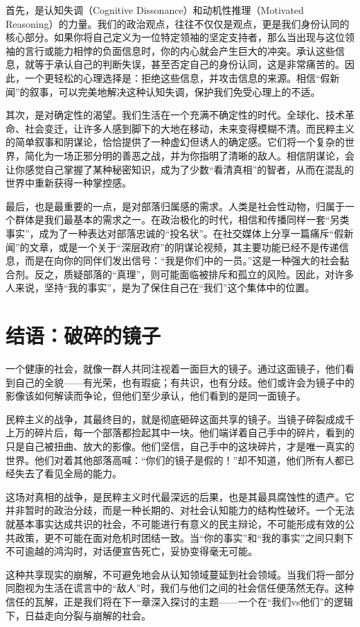 首先，是认知失调（Cognitive Dissonance）和动机性推理（Motivated Reasoning）的力量。我们的政治观点，往往不仅仅是观点，更是我们身份认同的核心部分。如果你将自己定义为一位特定领袖的坚定支持者，那么当出现与这位领袖的言行或能力相悖的负面信息时，你的内心就会产生巨大的冲突。承认这些信息，就等于承认自己的判断失误，甚至否定自己的身份认同，这是非常痛苦的。因此，一个更轻松的心理选择是：拒绝这些信息，并攻击信息的来源。相信“假新闻”的叙事，可以完美地解决这种认知失调，保护我们免受心理上的不适。

其次，是对确定性的渴望。我们生活在一个充满不确定性的时代。全球化、技术革命、社会变迁，让许多人感到脚下的大地在移动，未来变得模糊不清。而民粹主义的简单叙事和阴谋论，恰恰提供了一种虚幻但诱人的确定感。它们将一个复杂的世界，简化为一场正邪分明的善恶之战，并为你指明了清晰的敌人。相信阴谋论，会让你感觉自己掌握了某种秘密知识，成为了少数“看清真相”的智者，从而在混乱的世界中重新获得一种掌控感。

最后，也是最重要的一点，是对部落归属感的需求。人类是社会性动物，归属于一个群体是我们最基本的需求之一。在政治极化的时代，相信和传播同样一套“另类事实”，成为了一种表达对部落忠诚的“投名状”。在社交媒体上分享一篇痛斥“假新闻”的文章，或是一个关于“深层政府”的阴谋论视频，其主要功能已经不是传递信息，而是在向你的同伴们发出信号：“我是你们中的一员。”这是一种强大的社会黏合剂。反之，质疑部落的“真理”，则可能面临被排斥和孤立的风险。因此，对许多人来说，坚持“我的事实”，是为了保住自己在“我们”这个集体中的位置。

\section{结语：破碎的镜子}
一个健康的社会，就像一群人共同注视着一面巨大的镜子。通过这面镜子，他们看到自己的全貌——有光荣，也有瑕疵；有共识，也有分歧。他们或许会为镜子中的影像该如何解读而争论，但他们至少承认，他们看到的是同一面镜子。

民粹主义的战争，其最终目的，就是彻底砸碎这面共享的镜子。当镜子碎裂成成千上万的碎片后，每一个部落都捡起其中一块。他们端详着自己手中的碎片，看到的只是自己被扭曲、放大的影像。他们坚信，自己手中的这块碎片，才是唯一真实的世界。他们对着其他部落高喊：“你们的镜子是假的！”却不知道，他们所有人都已经失去了看见全局的能力。

这场对真相的战争，是民粹主义时代最深远的后果，也是其最具腐蚀性的遗产。它并非暂时的政治分歧，而是一种长期的、对社会认知能力的结构性破坏。一个无法就基本事实达成共识的社会，不可能进行有意义的民主辩论，不可能形成有效的公共政策，更不可能在面对危机时团结一致。当“你的事实”和“我的事实”之间只剩下不可逾越的鸿沟时，对话便宣告死亡，妥协变得毫无可能。

这种共享现实的崩解，不可避免地会从认知领域蔓延到社会领域。当我们将一部分同胞视为生活在谎言中的“敌人”时，我们与他们之间的社会信任便荡然无存。这种信任的瓦解，正是我们将在下一章深入探讨的主题——一个在“我们vs他们”的逻辑下，日益走向分裂与崩解的社会。